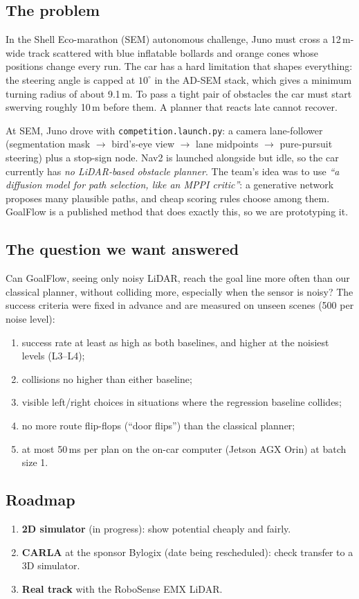 \documentclass[11pt,a4paper]{article}
\newcommand{\code}[1]{\texttt{#1}}
\begin{document}
\subsection{The problem}
In the Shell Eco-marathon (SEM) autonomous challenge, Juno must cross a 12\,m-wide track scattered with
blue inflatable bollards and orange cones whose positions change every run. The car has a hard
limitation that shapes everything: the steering angle is capped at $10^\circ$ in the AD-SEM stack, which
gives a minimum turning radius of about 9.1\,m. To pass a tight pair of obstacles the car must start
swerving roughly 10\,m before them. A planner that reacts late cannot recover.

At SEM, Juno drove with \code{competition.launch.py}: a camera lane-follower (segmentation mask $\to$
bird's-eye view $\to$ lane midpoints $\to$ pure-pursuit steering) plus a stop-sign node. Nav2 is launched alongside
but idle, so the car currently has \emph{no LiDAR-based obstacle planner}. The team's idea was to
use \emph{``a diffusion model for path selection, like an MPPI critic''}: a generative network proposes
many plausible paths, and cheap scoring rules choose among them. GoalFlow is a published method that does
exactly this, so we are prototyping it.

\subsection{The question we want answered}
Can GoalFlow, seeing only noisy LiDAR, reach the goal line more often than our classical planner, without
colliding more, especially when the sensor is noisy? The success criteria were fixed in advance and are
measured on unseen scenes (500 per noise level):
\begin{enumerate}[nosep]
  \item success rate at least as high as both baselines, and higher at the noisiest levels (L3--L4);
  \item collisions no higher than either baseline;
  \item visible left/right choices in situations where the regression baseline collides;
  \item no more route flip-flops (``door flips'') than the classical planner;
  \item at most 50\,ms per plan on the on-car computer (Jetson AGX Orin) at batch size 1.
\end{enumerate}

\subsection{Roadmap}
\begin{enumerate}[nosep]
  \item \textbf{2D simulator} (in progress): show potential cheaply and fairly.
  \item \textbf{CARLA} at the sponsor Bylogix (date being rescheduled): check transfer to a 3D simulator.
  \item \textbf{Real track} with the RoboSense EMX LiDAR.
\end{enumerate}
\end{document}
